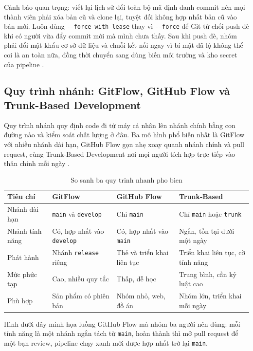 Cảnh báo quan trọng: viết lại lịch sử đổi toàn bộ mã định danh commit nên mọi thành viên phải xóa bản cũ và clone lại, tuyệt đối không hợp nhất bản cũ vào bản mới. Luôn dùng \verb|--force-with-lease| thay vì \verb|--force| để Git từ chối push đè khi có người vừa đẩy commit mới mà mình chưa thấy. Sau khi push đè, nhóm phải đổi mật khẩu cơ sở dữ liệu và chuỗi kết nối ngay vì bí mật đã lộ không thể coi là an toàn nữa, đồng thời chuyển sang dùng biến môi trường và kho secret của pipeline \cite{githubdocs,gitlabdocs}.

\subsection{Quy trình nhánh: GitFlow, GitHub Flow và Trunk-Based Development}

Quy trình nhánh quy định code đi từ máy cá nhân lên nhánh chính bằng con đường nào và kiểm soát chất lượng ở đâu. Ba mô hình phổ biến nhất là GitFlow với nhiều nhánh dài hạn, GitHub Flow gọn nhẹ xoay quanh nhánh chính và pull request, cùng Trunk-Based Development nơi mọi người tích hợp trực tiếp vào thân chính mỗi ngày \cite{gitflow}.

\begin{table}[H]
\centering
\caption{So sanh ba quy trinh nhanh pho bien}
\label{tab:c33-workflow}
\begin{tabular}{llll}
\toprule
Tiêu chí & GitFlow & GitHub Flow & Trunk-Based \\
\midrule
Nhánh dài hạn & \verb|main| và \verb|develop| & Chỉ \verb|main| & Chỉ \verb|main| hoặc \verb|trunk| \\
Nhánh tính năng & Có, hợp nhất vào \verb|develop| & Có, hợp nhất vào \verb|main| & Ngắn, tồn tại dưới một ngày \\
Phát hành & Nhánh \verb|release| riêng & Thẻ và triển khai liên tục & Triển khai liên tục, cờ tính năng \\
Mức phức tạp & Cao, nhiều quy tắc & Thấp, dễ học & Trung bình, cần kỷ luật cao \\
Phù hợp & Sản phẩm có phiên bản & Nhóm nhỏ, web, đồ án & Nhóm lớn, triển khai mỗi ngày \\
\bottomrule
\end{tabular}
\end{table}

Hình dưới đây minh họa luồng GitHub Flow mà nhóm ba người nên dùng: mỗi tính năng là một nhánh ngắn tách từ \verb|main|, hoàn thành thì mở pull request để một bạn review, pipeline chạy xanh mới được hợp nhất trở lại \verb|main|.

